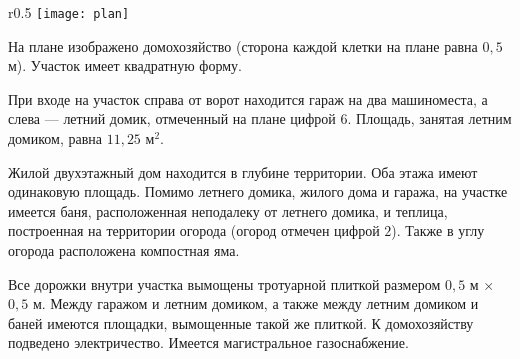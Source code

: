 \documentclass[12pt, a4paper]{article}
\begin{document}
	  
	\begin{wrapfigure}{r}{0.5\textwidth}
		\texttt{[image: plan]}
	\end{wrapfigure}
	На плане изображено домохозяйство (сторона каждой клетки на плане равна $0,5$ м). Участок имеет квадратную форму.
	
	При входе на участок справа от ворот находится гараж на два машиноместа, а слева — летний домик, отмеченный на плане цифрой 6. Площадь, занятая летним домиком, равна $11,25$ м$^2$.
	
	Жилой двухэтажный дом находится в глубине территории. Оба этажа имеют одинаковую площадь. Помимо летнего домика, жилого дома и гаража, на участке имеется баня, расположенная неподалеку от летнего домика, и теплица, построенная на территории огорода (огород отмечен цифрой $2$). Также в углу огорода расположена компостная яма.
	
	Все дорожки внутри участка вымощены тротуарной плиткой размером $0,5$ м × $0,5$ м. Между гаражом и летним домиком, а также между летним домиком и баней имеются площадки, вымощенные такой же плиткой. К домохозяйству подведено электричество. Имеется магистральное газоснабжение.
	
\end{document}
